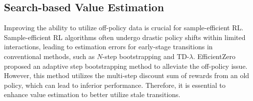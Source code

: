







\subsection{Search-based Value Estimation}


Improving the ability to utilize off-policy data is crucial for sample-efficient RL. Sample-efficient RL algorithms often undergo drastic policy shifts within limited interactions, leading to estimation errors for early-stage transitions in conventional methods, such as \( N \)-step bootstrapping and TD-\( \lambda \). EfficientZero proposed an adaptive step bootstrapping method to alleviate the off-policy issue. 
However, this method utilizes the multi-step discount sum of rewards from an old policy, which can lead to inferior performance. Therefore, it is essential to enhance value estimation to better utilize stale transitions.


